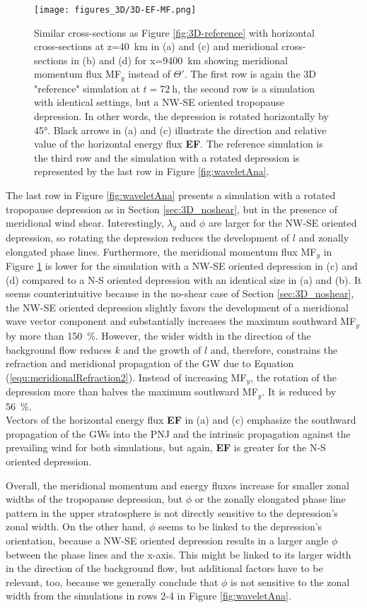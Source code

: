 \begin{figure}[t]
    \centering
    \texttt{[image: figures\_3D/3D-EF-MF.png]}
    \caption{Similar cross-sections as Figure \ref{fig:3D-reference} with horizontal cross-sections at z=\SI{40}{\kilo\meter} in (a) and (c) and meridional cross-sections in (b) and (d) for x=\SI{9400}{\kilo\meter} showing meridional momentum flux MF$_y$ instead of $\Theta'$. The first row is again the 3D "reference" simulation at $t=\SI{72}{\hour}$, the second row is a simulation with identical settings, but a NW-SE oriented tropopause depression. In other words, the depression is rotated horizontally by 45°. Black arrows in (a) and (c) illustrate the direction and relative value of the horizontal energy flux \textbf{EF}. The reference simulation is the third row and the simulation with a rotated depression is represented by the last row in Figure \ref{fig:waveletAna}.}
    \label{fig:3D-MFy}
\end{figure}
The last row in Figure \ref{fig:waveletAna} presents a simulation with a rotated tropopause depression as in Section \ref{sec:3D_noshear}, but in the presence of meridional wind shear. Interestingly, $\lambda_y$ and $\phi$ are larger for the NW-SE oriented depression, so rotating the depression reduces the development of $l$ and zonally elongated phase lines. Furthermore, the meridional momentum flux MF$_y$ in Figure \ref{fig:3D-MFy} is lower for the simulation with a NW-SE oriented depression in (c) and (d) compared to a N-S oriented depression with an identical size in (a) and (b). It seems counterintuitive because in the no-shear case of Section \ref{sec:3D_noshear}, the NW-SE oriented depression slightly favors the development of a meridional wave vector component and substantially increases the maximum southward MF$_y$ by more than \SI{150}{\percent}. However, the wider width in the direction of the background flow reduces $k$ and the growth of $l$ and, therefore, constrains the refraction and meridional propagation of the GW due to Equation (\ref{equ:meridionalRefraction2}). Instead of increasing MF$_y$, the rotation of the depression more than halves the maximum southward MF$_y$. It is reduced by \SI{56}{\percent}.\\
Vectors of the horizontal energy flux \textbf{EF} in (a) and (c) emphasize the southward propagation of the GWs into the PNJ and the intrinsic propagation against the prevailing wind for both simulations, but again, \textbf{EF} is greater for the N-S oriented depression.

Overall, the meridional momentum and energy fluxes increase for smaller zonal widths of the tropopause depression, but $\phi$ or the zonally elongated phase line pattern in the upper stratosphere is not directly sensitive to the depression's zonal width. On the other hand, $\phi$ seems to be linked to the depression's orientation, because a NW-SE oriented depression results in a larger angle $\phi$ between the phase lines and the x-axis. This might be linked to its larger width in the direction of the background flow, but additional factors have to be relevant, too, because we generally conclude that $\phi$ is not sensitive to the zonal width from the simulations in rows 2-4 in Figure \ref{fig:waveletAna}.

